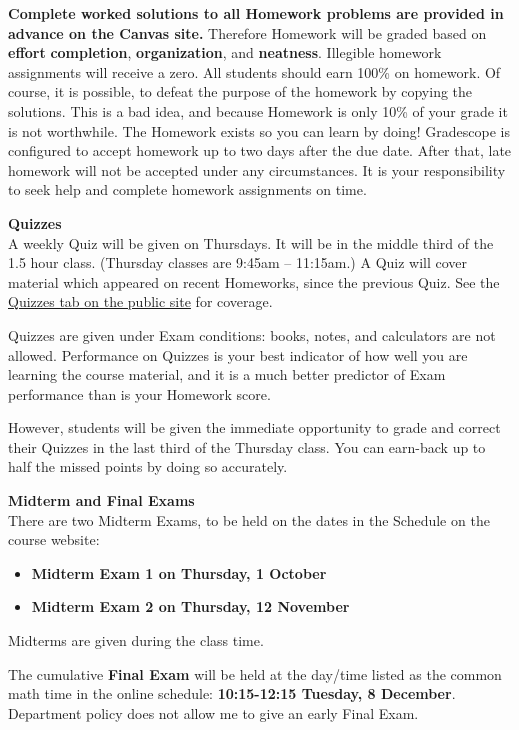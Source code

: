 \documentclass[12pt]{article}
\renewcommand{\emph}[1]{\textsf{\textbf{#1}}}
\newcommand{\localhead}[1]{\par\smallskip\textbf{#1} \smallskip\nobreak\\}%
\def\heading#1{\localhead{\large\emph{#1}}}
\begin{document}
\emph{Complete worked solutions to all Homework problems are provided
in advance on the Canvas site.}  Therefore Homework will be graded
based on \emph{effort} \emph{completion}, \emph{organization}, and
\emph{neatness}.  Illegible homework assignments will receive a
zero. All students should
earn 100\% on homework.  Of course, it is possible, to defeat the
purpose of the homework by copying the solutions.  This is a bad idea,
and because Homework is only 10\% of your grade it is not worthwhile.
The Homework exists so you can learn by doing! Gradescope is
configured to accept homework up to two days after the due date. After
that, late homework will not be accepted under any circumstances. It
is your responsibility to seek help and complete homework
assignments on time.


\heading{Quizzes}
A weekly Quiz will be given on Thursdays.  It will be in the middle
third of the 1.5 hour class.  (Thursday classes are 9:45am --
11:15am.)  A Quiz will cover material which appeared on recent
Homeworks, since the previous Quiz.  See the
\href{https://uaf-math.github.io/calc2/quizzes.html}{Quizzes tab on
the public site} for coverage.

Quizzes are given under Exam conditions: books, notes, and calculators
are not allowed.  Performance on Quizzes is your best indicator of how
well you are learning the course material, and it is a much better
predictor of Exam performance than is your Homework score.

However, students will be given the immediate opportunity to grade and
correct their Quizzes in the last third of the Thursday class.  You
can earn-back up to half the missed points by doing so accurately.


\heading{Midterm and Final Exams}
There are two Midterm Exams, to be held on the dates in the Schedule on the course website:
\begin{itemize}
\item \emph{Midterm Exam 1 on Thursday, 1 October}
\item \emph{Midterm Exam 2 on Thursday, 12 November}
\end{itemize}
Midterms are given during the class time.

The cumulative \emph{Final Exam} will be held at the day/time listed
as the common math time in the online schedule: \emph{10:15-12:15
Tuesday, 8 December}. Department policy does not allow me to give an
early Final Exam.
\end{document}
